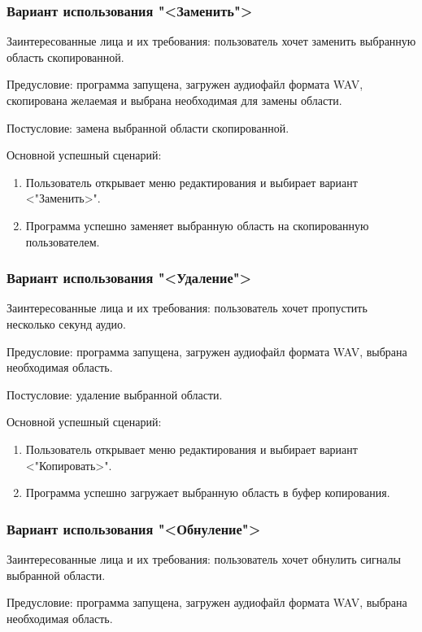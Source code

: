 \subsubsection{Вариант использования "<Заменить">}

Заинтересованные лица и их требования: пользователь хочет заменить выбранную область скопированной.

Предусловие: программа запущена, загружен аудиофайл формата WAV, скопирована желаемая и выбрана необходимая для замены области.

Постусловие: замена выбранной области скопированной.

Основной успешный сценарий:
\begin{enumerate}
	\item Пользователь открывает меню редактирования и выбирает вариант <"Заменить>".
	\item Программа успешно заменяет выбранную область на скопированную пользователем.
\end{enumerate} 

\subsubsection{Вариант использования "<Удаление">}

Заинтересованные лица и их требования: пользователь хочет пропустить несколько секунд аудио.

Предусловие: программа запущена, загружен аудиофайл формата WAV, выбрана необходимая область.

Постусловие: удаление выбранной области.

Основной успешный сценарий:
\begin{enumerate}
	\item Пользователь открывает меню редактирования и выбирает вариант <"Копировать>".
	\item Программа успешно загружает выбранную область в буфер копирования.
\end{enumerate} 

\subsubsection{Вариант использования "<Обнуление">}

Заинтересованные лица и их требования: пользователь хочет обнулить сигналы выбранной области.

Предусловие: программа запущена, загружен аудиофайл формата WAV, выбрана необходимая область.


